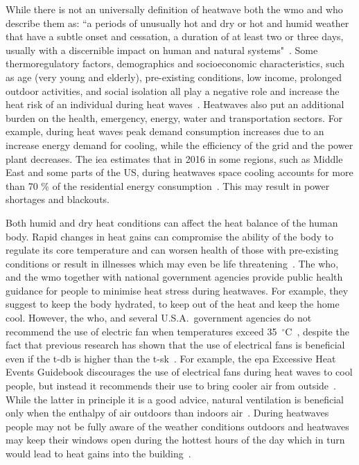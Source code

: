 While there is not an universally definition of heatwave both the \ac{wmo} and \ac{who} describe them as: ``a periods of unusually hot and dry or hot and humid weather that have a subtle onset and cessation, a duration of at least two or three days, usually with a discernible impact on human and natural systems"~\cite{WMO2015}.
Some thermoregulatory factors, demographics and socioeconomic characteristics, such as age (very young and elderly), pre-existing conditions, low income, prolonged outdoor activities, and social isolation all play a negative role and increase the heat risk of an individual during heat waves~\cite{WMO2015}.
Heatwaves also put an additional burden on the health, emergency, energy, water and transportation sectors.
For example, during heat waves peak demand consumption increases due to an increase energy demand for cooling, while the efficiency of the grid and the power plant decreases.
The \ac{iea} estimates that in 2016 in some regions, such as Middle East and some parts of the US, during heatwaves space cooling accounts for more than 70 \% of the residential energy consumption~\cite{IEA2018}.
This may result in power shortages and blackouts.

Both humid and dry heat conditions can affect the heat balance of the human body.
Rapid changes in heat gains can compromise the ability of the body to regulate its core temperature and can worsen health of those with pre-existing conditions or result in illnesses which may even be life threatening~\cite{WMO2015}.
The \ac{who}, and the \ac{wmo} together with national government agencies provide public health guidance for people to minimise heat stress during heatwaves.
For example, they suggest to keep the body hydrated, to keep out of the heat and keep the home cool.
However, the \ac{who}, and several U.S.A.\ government agencies do not recommend the use of electric fan when temperatures exceed 35~$^{\circ}$C~\cite{ExtremeH66:online, Frequent18:online, HeatandH28:online, WMO2015}, despite the fact that previous research has shown that the use of electrical fans is beneficial even if the \ac{t-db} is higher than the \ac{t-sk}~\cite{Rate2015, Jay2015, Jay2019a, Rate2015}.
For example, the \ac{epa} Excessive Heat Events Guidebook discourages the use of electrical fans during heat waves to cool people, but instead it recommends their use to bring cooler air from outside~\cite{UnitedStatesEnvironmentalProtectionAgency2006}.
While the latter in principle it is a good advice, natural ventilation is beneficial only when the enthalpy of air outdoors than indoors air~\cite{Fiorentini2019}\@.
During heatwaves people may not be fully aware of the weather conditions outdoors and heatwaves may keep their windows open during the hottest hours of the day which in turn would lead to heat gains into the building~\cite{Tartarini2017}.

